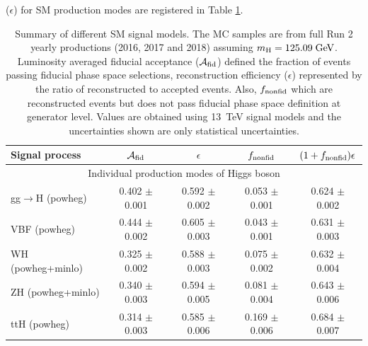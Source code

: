 ($\epsilon$) for SM production modes are registered in Table \ref{tab:summarySMfullRun2}.   
\begin{table}[!h!tb]
        \begin{center}
                \small
                \caption{
			Summary of different SM signal models. The MC samples are from full Run 2 yearly productions (2016, 2017 and 2018) assuming $m_{\rm H} = 125.09\hbox{$\;\hbox{\rm GeV}$}$. Luminosity averaged fiducial acceptance ($\mathcal{A}_{\rm fid}$) defined the fraction of events passing fiducial phase space selections, reconstruction efficiency ($\epsilon$)
represented by the ratio of reconstructed to accepted events. Also, $f_{\rm nonfid}$ which are reconstructed events but does not pass fiducial phase space definition
at generator level. Values are obtained using 13~TeV signal models and the uncertainties shown are only statistical uncertainties.
                        \label{tab:summarySMfullRun2}
                }
                \begin{tabular}{|l|c|c|c|c|} \hline \hline
                        \textbf{Signal process} & $\mathcal{A}_{\rm fid}$ & $\epsilon$ & $f_{\rm nonfid}$  & $(1+f_{\rm nonfid})\epsilon$ \\ \hline \hline
                        \multicolumn{5}{|c|}{Individual production modes of Higgs boson} \\ \hline
			gg$\rightarrow$H ({\sc powheg})  & 0.402 $\pm$ 0.001 & 0.592 $\pm$ 0.002 & 0.053 $\pm$ 0.001 & 0.624 $\pm$ 0.002 \\  
			VBF ({\sc powheg})  & 0.444 $\pm$ 0.002 & 0.605 $\pm$ 0.003 & 0.043 $\pm$ 0.001 & 0.631 $\pm$ 0.003 \\  
			WH ({\sc powheg+minlo}) & 0.325 $\pm$ 0.002 & 0.588 $\pm$ 0.003 & 0.075 $\pm$ 0.002 & 0.632 $\pm$ 0.004 \\  
 			ZH ({\sc powheg+minlo})  & 0.340 $\pm$ 0.003 & 0.594 $\pm$ 0.005 & 0.081 $\pm$ 0.004 & 0.643 $\pm$ 0.006 \\  
 			ttH ({\sc powheg}) & 0.314 $\pm$ 0.003 & 0.585 $\pm$ 0.006 & 0.169 $\pm$ 0.006 & 0.684 $\pm$ 0.007 \\  
			

\end{tabular}
\end{center}
\end{table}
